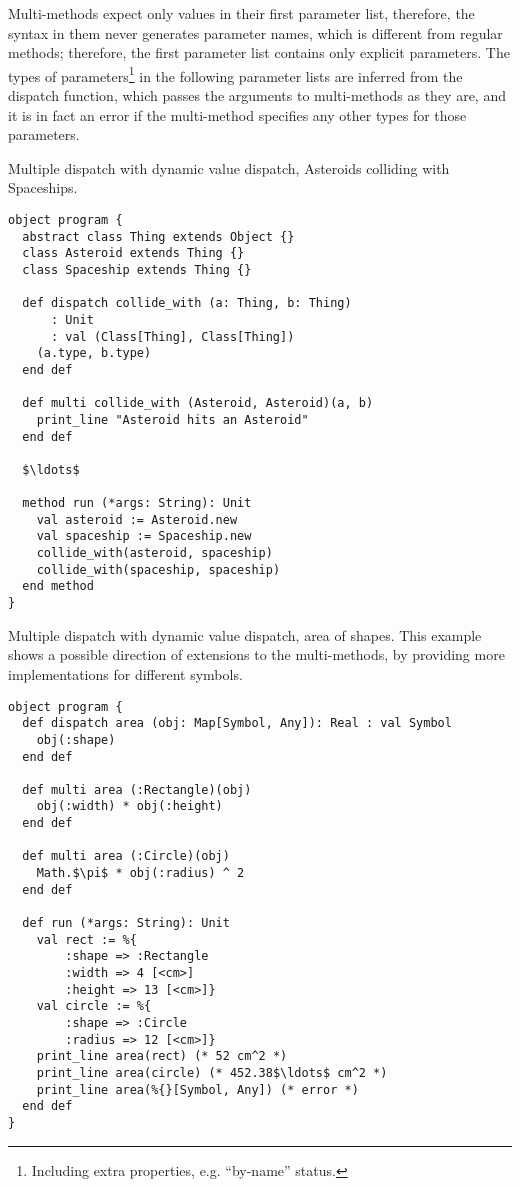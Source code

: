 Multi-methods expect only values in their first parameter list, therefore, the syntax in them never generates parameter names, which is different from regular methods; therefore, the first parameter list contains only explicit parameters. The types of parameters\footnote{Including extra properties, e.g. ``by-name'' status.} in the following parameter lists are inferred from the dispatch function, which passes the arguments to multi-methods as they are, and it is in fact an error if the multi-method specifies any other types for those parameters. 

\example Multiple dispatch with dynamic value dispatch, Asteroids colliding with Spaceships.
\begin{lstlisting}
object program {
  abstract class Thing extends Object {}
  class Asteroid extends Thing {}
  class Spaceship extends Thing {}
  
  def dispatch collide_with (a: Thing, b: Thing)
      : Unit 
      : val (Class[Thing], Class[Thing])
    (a.type, b.type)
  end def
  
  def multi collide_with (Asteroid, Asteroid)(a, b)
    print_line "Asteroid hits an Asteroid"
  end def
  
  $\ldots$
  
  method run (*args: String): Unit
    val asteroid := Asteroid.new
    val spaceship := Spaceship.new
    collide_with(asteroid, spaceship)
    collide_with(spaceship, spaceship)
  end method
}
\end{lstlisting}

\example Multiple dispatch with dynamic value dispatch, area of shapes. This example shows a possible direction of extensions to the multi-methods, by providing more implementations for different symbols. 
\begin{lstlisting}
object program {
  def dispatch area (obj: Map[Symbol, Any]): Real : val Symbol
    obj(:shape)
  end def
  
  def multi area (:Rectangle)(obj)
    obj(:width) * obj(:height)
  end def
  
  def multi area (:Circle)(obj)
    Math.$\pi$ * obj(:radius) ^ 2
  end def
  
  def run (*args: String): Unit
    val rect := %{
        :shape => :Rectangle
        :width => 4 [<cm>]
        :height => 13 [<cm>]}
    val circle := %{
        :shape => :Circle
        :radius => 12 [<cm>]}
    print_line area(rect) (* 52 cm^2 *)
    print_line area(circle) (* 452.38$\ldots$ cm^2 *)
    print_line area(%{}[Symbol, Any]) (* error *)
  end def
}
\end{lstlisting}















